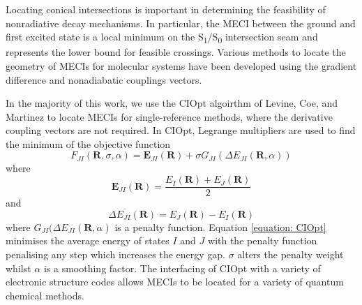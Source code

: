 Locating conical intersections is important in determining the feasibility of nonradiative decay mechanisms.\cite{Domcke2011} In particular, the \ac{MECI} between the ground and first excited state is a local minimum on the S\textsubscript{1}/S\textsubscript{0} intersection seam and represents the lower bound for feasible crossings. Various methods to locate the geometry of \acp{MECI} for molecular systems have been developed using the gradient difference and nonadiabatic couplings vectors.\cite{Koga1985,Manaa1993,Bearpark1994,Dallos2004,Yarkony2004} 

In the majority of this work, we use the CIOpt algoirthm of Levine, Coe, and Martinez to locate \acp{MECI} for single-reference methods, where the derivative coupling vectors are not required.\cite{Levine2008} In CIOpt, Legrange multipliers are used to find the minimum of the objective function
\begin{equation}\label{equation: CIOpt}
F_{JI}(\bm{R},\sigma{},\alpha{})=\bm{E}_{JI}(\bm{R})+\sigma{}G_{JI}(\Delta{}E_{JI}(\bm{R},\alpha))
\end{equation}
where 
\begin{equation}
    \bm{E}_{JI}(\bm{R})=\frac{E_{I}(\bm{R})+E_{J}(\bm{R})}{2}
\end{equation}
and
\begin{equation}
    \Delta{}E_{JI}(\bm{R})=E_{J}(\bm{R})-E_{I}(\bm{R})
\end{equation}
where $G_{JI}(\Delta{}E_{JI}(\bm{R},\alpha)$ is a penalty function. Equation \ref{equation: CIOpt} minimises the average energy of states $I$ and $J$ with the penalty function penalising any step which increases the energy gap.  $\sigma$ alters the penalty weight whilst $\alpha$ is a smoothing factor. The interfacing of CIOpt with a variety of electronic structure codes allows \acp{MECI} to be located for a variety of quantum chemical methods. 

